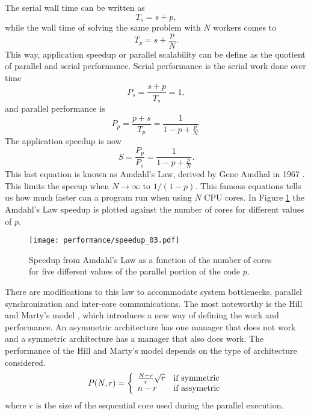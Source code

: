 	The serial wall time can be written as
\begin{equation}
	T_s = s + p,
\end{equation}	
while the wall time of solving the same problem with $N$ workers comes to
\begin{equation}
	T_p = s + \frac{p}{N}.
\end{equation}
This way, application speedup or parallel scalability can be define as the quotient of parallel and serial performance. Serial performance is the serial work done over time
\begin{equation}
	P_s = \frac{s+p}{T_s} = 1,
\end{equation} 
and parallel performance is
\begin{equation}
	P_p = \frac{p+s}{T_p} = \frac{1}{1-p+\frac{p}{N}}.
\end{equation}
The application speedup is now
\begin{equation}\label{amd_law}
	S = \frac{P_p}{P_s} = \frac{1}{1-p+\frac{p}{N}}.
\end{equation}
This last equation is known as Amdahl's Law, derived by Gene Amdhal in 1967 \cite{Amdahl1967}. This limits the speeup when $N \rightarrow \infty$ to $1/(1-p)$. This famous equations tells us how much faster can a program run when using $N$ CPU cores. In Figure \ref{amd_law} the Amdahl's Law speedup is plotted against the number of cores for different values of $p$.
\begin{figure}[h]
	\centering
	\texttt{[image: performance/speedup\_03.pdf]}
	\caption{Speedup from Amdahl's Law as a function of the number of cores for five different values of the parallel portion of the code $p$.}
	\label{amd_law}
\end{figure}

	There are modifications to this law \cite{On2014} to accommodate system bottlenecks, parallel synchronization and inter-core communications. The most noteworthy is the Hill and Marty's model \cite{Hill2008}, which introduces a new way of defining the work and performance. An asymmetric architecture has one manager that does not work and a symmetric architecture has a manager that also does work. The performance of the Hill and Marty's model depends on the type of architecture considered. 
\begin{equation}
		P(N, r) = \left\{ \begin{array}{ll}  \frac{N-r}{r} \sqrt{r}  & \mbox{if } \text{symmetric} \\ n-r & \mbox{if } \text{assymetric} \end{array} \right.
\end{equation}
where $r$ is the size of the sequential core used during the parallel execution. 


